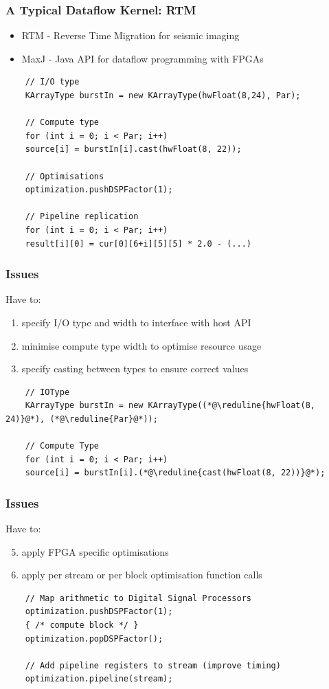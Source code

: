 \begin{frame}[fragile]
  \frametitle{A Typical Dataflow Kernel: RTM}
  \begin{itemize}
  \item RTM - Reverse Time Migration for seismic imaging
  \item MaxJ - Java API for dataflow programming with FPGAs
  \end{itemize}

  \begin{lstlisting}
    // I/O type
    KArrayType burstIn = new KArrayType(hwFloat(8,24), Par);

    // Compute type
    for (int i = 0; i < Par; i++)
    source[i] = burstIn[i].cast(hwFloat(8, 22));

    // Optimisations
    optimization.pushDSPFactor(1);

    // Pipeline replication
    for (int i = 0; i < Par; i++)
    result[i][0] = cur[0][6+i][5][5] * 2.0 - (...)
  \end{lstlisting}
\end{frame}

\begin{frame}[fragile]
  \frametitle{Issues}
  Have to:
  \begin{enumerate}

  \item specify I/O type and width to interface with host API
  \item minimise compute type width to optimise resource usage
  \item specify casting between types to ensure correct values
  \end{enumerate}

  \begin{lstlisting}
    // IOType
    KArrayType burstIn = new KArrayType((*@\reduline{hwFloat(8, 24)}@*), (*@\reduline{Par}@*));

    // Compute Type
    for (int i = 0; i < Par; i++)
    source[i] = burstIn[i].(*@\reduline{cast(hwFloat(8, 22))}@*);
  \end{lstlisting}
\end{frame}

\begin{frame}[fragile]
  \frametitle{Issues}
  Have to:
  \begin{enumerate}
    \setcounter{enumi}{4}
  \item apply FPGA specific optimisations
  \item apply per stream or per block optimisation function calls
  \end{enumerate}
  \begin{lstlisting}
    // Map arithmetic to Digital Signal Processors
    optimization.pushDSPFactor(1);
    { /* compute block */ }
    optimization.popDSPFactor();

    // Add pipeline registers to stream (improve timing)
    optimization.pipeline(stream);

  \end{lstlisting}
\end{frame}

